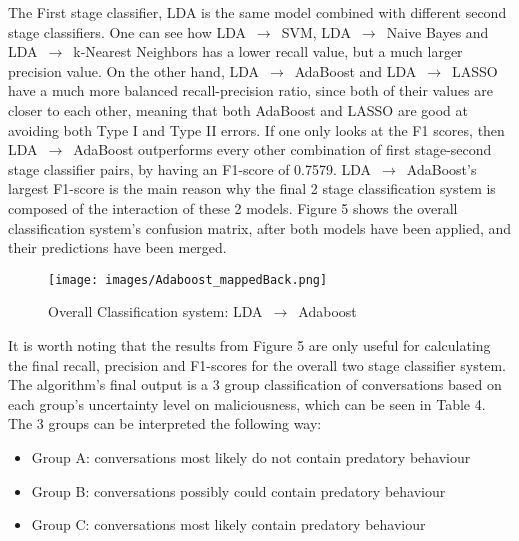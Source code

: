 \documentclass[11pt]{article}
\begin{document}
The First stage classifier, LDA is the same model combined with different second stage classifiers. One can see how LDA $\,\to\,$ SVM, LDA $\,\to\,$ Naive Bayes and LDA $\,\to\,$ k-Nearest Neighbors has a lower recall value, but a much larger precision value. On the other hand, LDA $\,\to\,$ AdaBoost and LDA $\,\to\,$ LASSO have a much more balanced recall-precision ratio, since both of their values are closer to each other, meaning that both AdaBoost and LASSO are good at avoiding both Type I and Type II errors. If one only looks at the F1 scores, then LDA $\,\to\,$ AdaBoost outperforms every other combination of first stage-second stage classifier pairs, by having an F1-score of 0.7579. LDA $\,\to\,$ AdaBoost's largest F1-score is the main reason why the final 2 stage classification  system is composed of the interaction of these 2 models. Figure 5 shows the overall classification system's confusion matrix, after both models have been applied, and their predictions have been merged.

\begin{figure}[h!]
    \centering
    \texttt{[image: images/Adaboost\_mappedBack.png]}
    \caption{Overall Classification system: LDA $\,\to\,$ Adaboost}
    \label{fig:word2vec}
\end{figure}

It is worth noting that the results from Figure 5 are only useful for calculating the final recall, precision and F1-scores for the overall two stage classifier system. The algorithm's final output is a 3 group classification of conversations based on each group's uncertainty level on maliciousness, which can be seen in Table 4. The 3 groups can be interpreted the following way:
\begin{itemize}
        \item Group A: conversations most likely do not contain predatory behaviour
        \item Group B: conversations possibly could contain predatory behaviour
        \item Group C: conversations most likely contain predatory behaviour
\end{itemize}
\end{document}
